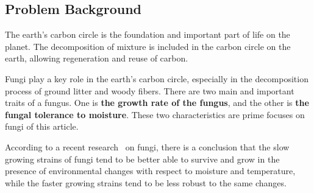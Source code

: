 \subsection{Problem Background}
The earth's carbon circle is the foundation and important part of life on the planet. The decomposition of mixture is included in the carbon circle on the earth, allowing regeneration and reuse of carbon.
\par
Fungi play a key role in the earth's carbon circle, especially in the decomposition process of ground litter and woody fibers. There are two main and important traits of a fungus. One is \textbf{the growth rate of the fungus}, and the other is \textbf{the fungal tolerance to moisture}. These two characteristics are prime focuses on fungi of this article.
\par
According to a recent research~\cite{researchonfungi} on fungi, there is a conclusion that the slow growing strains of fungi tend to be better able to survive and grow in the presence of environmental changes with respect to moisture and temperature, while the faster growing strains tend to be less robust to the same changes.